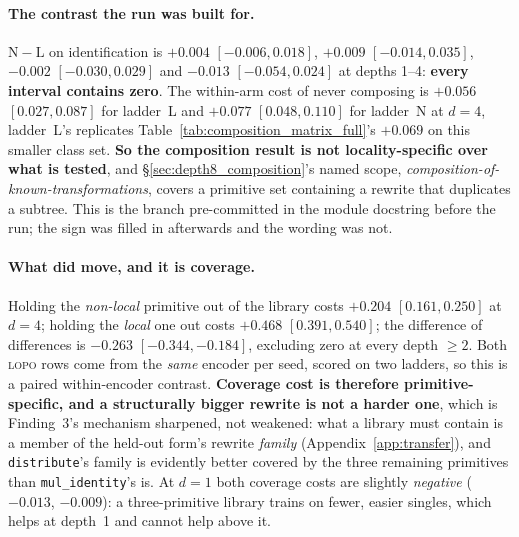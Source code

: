 \paragraph{The contrast the run was built for.} $\mathrm{N}-\mathrm{L}$ on identification is $+0.004$ $[-0.006,0.018]$, $+0.009$ $[-0.014,0.035]$, $-0.002$ $[-0.030,0.029]$ and $-0.013$ $[-0.054,0.024]$ at depths 1--4: \textbf{every interval contains zero}. The within-arm cost of never composing is $+0.056$ $[0.027,0.087]$ for ladder~L and $+0.077$ $[0.048,0.110]$ for ladder~N at $d{=}4$, ladder~L's replicates Table~\ref{tab:composition_matrix_full}'s $+0.069$ on this smaller class set. \textbf{So the composition result is not locality-specific over what is tested}, and \S\ref{sec:depth8_composition}'s named scope, \emph{composition-of-known-transformations}, covers a primitive set containing a rewrite that duplicates a subtree. This is the branch pre-committed in the module docstring before the run; the sign was filled in afterwards and the wording was not.

\paragraph{What did move, and it is coverage.} Holding the \emph{non-local} primitive out of the library costs $+0.204$ $[0.161,0.250]$ at $d{=}4$; holding the \emph{local} one out costs $+0.468$ $[0.391,0.540]$; the difference of differences is $-0.263$ $[-0.344,-0.184]$, excluding zero at every depth ${\geq}2$. Both \textsc{lopo} rows come from the \emph{same} encoder per seed, scored on two ladders, so this is a paired within-encoder contrast. \textbf{Coverage cost is therefore primitive-specific, and a structurally bigger rewrite is not a harder one}, which is Finding~3's mechanism sharpened, not weakened: what a library must contain is a member of the held-out form's rewrite \emph{family} (Appendix~\ref{app:transfer}), and \texttt{distribute}'s family is evidently better covered by the three remaining primitives than \texttt{mul\_identity}'s is. At $d{=}1$ both coverage costs are slightly \emph{negative} ($-0.013$, $-0.009$): a three-primitive library trains on fewer, easier singles, which helps at depth~1 and cannot help above it.

